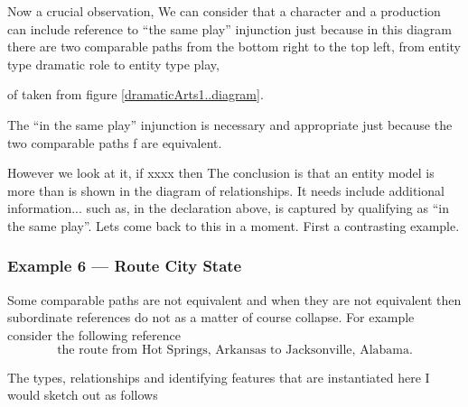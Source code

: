 \mynote
\begin{worktt}
Now a crucial observation, 
We can consider that a character and a production can include reference to ``the same play'' injunction  just because in this diagram 
there are two comparable paths from the bottom right to the top left, from entity type dramatic role to entity type play, 
\end{worktt}

\begin{equation}
\label{dramaticArtsPortrayalScopeFragment..diagram}

\end{equation}
of taken from figure \ref{dramaticArts1..diagram}.

The ``in the same play'' injunction is necessary 
and appropriate just because 
the two comparable paths f are equivalent.


\begin{reinstatett}
\mynote
However we look at it, if xxxx then The conclusion is that an entity model is more than is shown in the diagram of relationships. It needs include additional information... such as, in the declaration above,
 is captured by qualifying as ``in the same play''. Lets come back to this in a moment. First a contrasting example.
 \end{reinstatett} 

\subsubsection {Example 6 --- Route City State}

\mynote 
Some comparable paths are not equivalent and when they are not equivalent then subordinate references do not as a matter of course collapse. For example consider the following reference
 \begin{equation*}
 \mbox{the route from Hot Springs, Arkansas to Jacksonville, Alabama.}
\end{equation*}

The types, relationships and identifying features that are instantiated here
I would sketch out as follows

\iffalse
\begin{equation*}

\end{equation*}
\fi
\begin{equation*}

\end{equation*}


